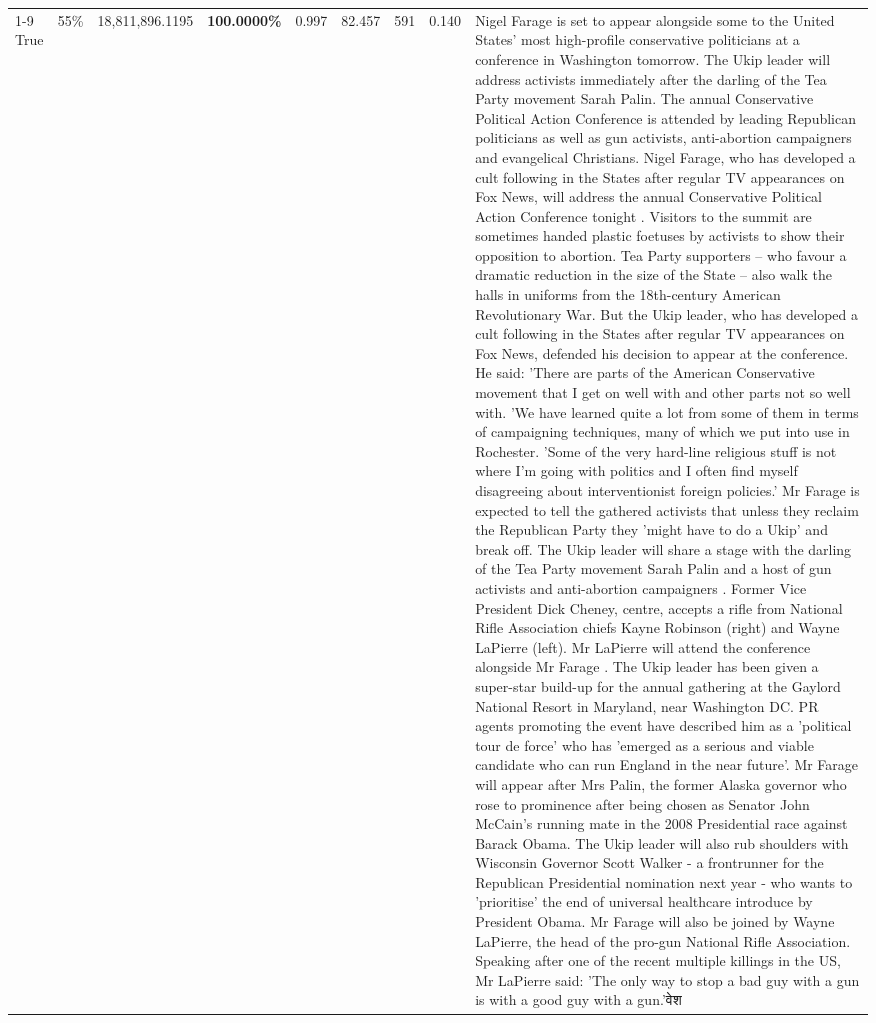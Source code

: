 \begin{table}[H]
\begin{tabular}{lllrlllll}
\cline{1-9} \cline{2-9}
True & 55\% & 18,811,896.1195 & \bfseries \color{red} 100.0000\% & 0.997 & 82.457 & 591 & 0.140 & Nigel Farage is set to appear alongside some to the United States' most high-profile conservative politicians at a conference in Washington tomorrow. The Ukip leader will address activists immediately after the darling of the Tea Party movement Sarah Palin. The annual Conservative Political Action Conference is attended by leading Republican politicians as well as gun activists, anti-abortion campaigners and evangelical Christians. Nigel Farage, who has developed a cult following in the States after regular TV appearances on Fox News, will address the annual Conservative Political Action Conference tonight . Visitors to the summit are sometimes handed plastic foetuses by activists to show their opposition to abortion. Tea Party supporters – who favour a dramatic reduction in the size of the State – also walk the halls in uniforms from the 18th-century American Revolutionary War. But the Ukip leader, who has developed a cult following in the States after regular TV appearances on Fox News, defended his decision to appear at the conference. He said: 'There are parts of the American Conservative movement that I get on well with and other parts not so well with. 'We have learned quite a lot from some of them in terms of campaigning techniques, many of which we put into use in Rochester. 'Some of the very hard-line religious stuff is not where I'm going with politics and I often find myself disagreeing about interventionist foreign policies.' Mr Farage is expected to tell the gathered activists that unless they reclaim the Republican Party they 'might have to do a Ukip' and break off. The Ukip leader will share a stage with the darling of the Tea Party movement Sarah Palin and a host of gun activists and anti-abortion campaigners . Former Vice President Dick Cheney, centre, accepts a rifle from National Rifle Association chiefs Kayne Robinson (right) and Wayne LaPierre (left). Mr LaPierre will attend the conference alongside Mr Farage . The Ukip leader has been given a super-star build-up for the annual gathering at the Gaylord National Resort in Maryland, near Washington DC. PR agents promoting the event have described him as a 'political tour de force' who has 'emerged as a serious and viable candidate who can run England in the near future'. Mr Farage will appear after Mrs Palin, the former Alaska governor who rose to prominence after being chosen as Senator John McCain's running mate in the 2008 Presidential race against Barack Obama. The Ukip leader will also rub shoulders with Wisconsin Governor Scott Walker - a frontrunner for the Republican Presidential nomination next year - who wants to 'prioritise' the end of universal healthcare introduce by President Obama. Mr Farage will also be joined by Wayne LaPierre, the head of the pro-gun National Rifle Association. Speaking after one of the recent multiple killings in the US, Mr LaPierre said: 'The only way to stop a bad guy with a gun is with a good guy with a gun.'वेश \\

\end{tabular}
\end{table}
